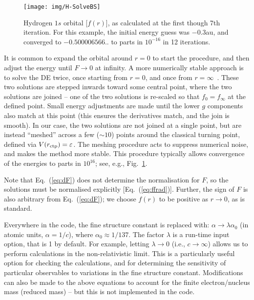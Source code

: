 \documentclass[10pt,twocolumn,a4paper]{article}%
\def\en{\ensuremath{\varepsilon}}
\begin{document}
\begin{figure}
\centering
\texttt{[image: img/H-SolveBS]}
\caption{\small Hydrogen $1s$ orbital [$f(r)$], as calculated at the first though 7th iteration. 
For this example, the initial energy guess was $-0.3$au, and converged to $-0.500006566..$ to parts in $10^{-16}$ in 12 iterations.\label{fig:H-SolveBS}}
\end{figure}



It is common to expand the orbital around $r=0$ to start the procedure, and then adjust the energy until $F\to0$ at infinity.
%
A more numerically stable approach is to solve the DE twice, once starting from $r=0$, and once from $r=\infty$~\cite{JohnsonBook2007}.
These two solutions are stepped inwards toward some central point, where the two solutions are joined -- one of the two solutions is re-scaled so that $f_0=f_\infty$ at the defined point.
Small energy adjustments are made until the lower $g$ components also match at this point (this ensures the derivatives match, and the join is smooth).
In our case, the two solutions are not joined at a single point, but are instead ``meshed'' across a few ($\sim10$)  points around the classical turning point, defined via $V(r_{\rm ctp}) = \en$.
The meshing procedure acts to suppress numerical noise, and makes the method more stable.
This procedure typically allows convergence of the energies to parts in $10^{16}$;
see, e.g., Fig.~\ref{fig:H-SolveBS}.






Note that Eq.~(\ref{eq:dF}) does not determine the normalisation for $F$, so the solutions must be normalised explicitly [Eq.~(\ref{eq:ffrad})].
Further, the sign of $F$ is also arbitrary from Eq.~(\ref{eq:dF}); we choose $f(r)$ to be positive as $r\to 0$, as is standard.


Everywhere in the code, the fine structure constant is replaced with: $\alpha\to\lambda \alpha_0$ (in atomic units, $\alpha=1/c$), where $\alpha_0\approx1/137$.
The factor $\lambda$ is a run-time input option, that is 1 by default. 
For example, letting $\lambda\to0$ (i.e., $c\to\infty$) allows us to perform calculations in the non-relativistic limit.
This is a particularly useful option for checking the calculations, and for determining the sensitivity of particular observables to variations in the fine structure constant.
Modifications can also be made to the above equations to account for the finite electron/nucleus mass (reduced mass) -- but this is not implemented in the code.
\end{document}
